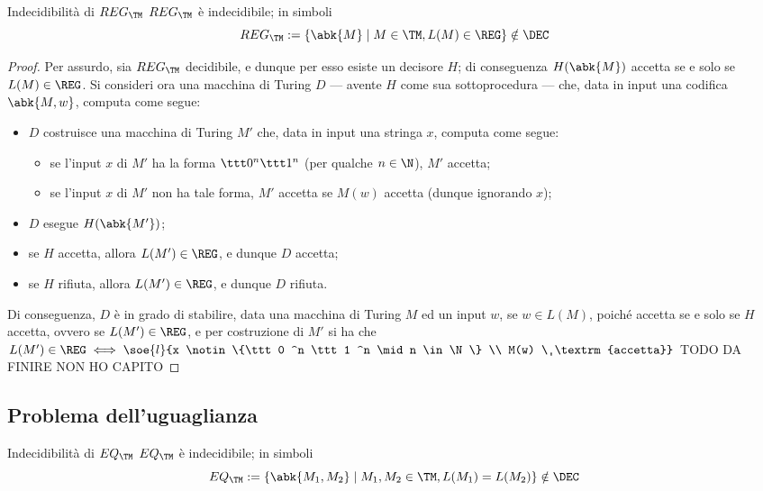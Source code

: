 \documentclass[a4paper, 12pt]{report}
\begin{document}
    \begin{framedthm}{Indecidibilità di $REG_\TM$}
        $REG_\TM$ è indecidibile; in simboli $$REG_\TM := \{\abk{M} \mid M \in \TM , L(M) \in \REG\} \notin \DEC$$
    \end{framedthm}

    \begin{proof}
        Per assurdo, sia $REG_\TM$ decidibile, e dunque per esso esiste un decisore $H$; di conseguenza $H(\abk{M})$ accetta se e solo se $L(M) \in \REG$. Si consideri ora una macchina di Turing $D$ --- avente $H$ come sua sottoprocedura --- che, data in input una codifica $\abk{M, w}$, computa come segue:

        \begin{itemize}
            \item $D$ costruisce una macchina di Turing $M'$ che, data in input una stringa $x$, computa come segue:
                \begin{itemize}
                    \item se l'input $x$ di $M'$ ha la forma $\ttt 0^n \ttt 1 ^n$ (per qualche $n \in \N$), $M'$ accetta;
                    \item se l'input $x$ di $M'$ non ha tale forma, $M'$ accetta se $M(w)$ accetta (dunque ignorando $x$);
                \end{itemize}
            \item $D$ esegue $H(\abk{M'})$;
            \item se $H$ accetta, allora $L(M') \in \REG$, e dunque $D$ accetta;
            \item se $H$ rifiuta, allora $L(M') \in \REG$, e dunque $D$ rifiuta.
        \end{itemize}

        Di conseguenza, $D$ è in grado di stabilire, data una macchina di Turing $M$ ed un input $w$, se $w \in L(M)$, poiché accetta se e solo se $H$ accetta, ovvero se $L(M') \in \REG$, e per costruzione di $M'$ si ha che $L(M') \in \REG \iff \soe{l}{x \notin \{\ttt 0 ^n \ttt 1 ^n \mid n \in \N\} \\ M(w) \ \textrm{accetta}}$ TODO DA FINIRE NON HO CAPITO
    \end{proof}

    \subsection{Problema dell'uguaglianza}

    \begin{framedthm}{Indecidibilità di $EQ_\TM$}
        $EQ_\TM$ è indecidibile; in simboli $$EQ_\TM := \{\abk{M_1, M_2} \mid M_1, M_2 \in \TM, L(M_1) = L(M_2)\} \notin \DEC$$
    \end{framedthm}
\end{document}
